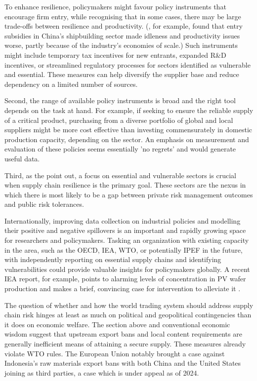 \documentclass{article}
\begin{document}
To enhance resilience, policymakers might favour policy instruments that encourage firm entry, while recognising that in some cases, there may be large trade-offs between resilience and productivity. (\textcite{barwick_chinas_2019}, for example, found that entry subsidies in China's shipbuilding sector made idleness and productivity issues worse, partly because of the industry's economies of scale.) Such instruments might include temporary tax incentives for new entrants, expanded R\&D incentives, or streamlined regulatory processes for sectors identified as vulnerable and essential. These measures can help diversify the supplier base and reduce dependency on a limited number of sources.

Second, the range of available policy instruments is broad and the right tool depends on the task at hand. For example, if seeking to ensure the reliable supply of a critical product, purchasing from a diverse portfolio of global and local suppliers might be more cost effective than investing commensurately in domestic production capacity, depending on the sector. An emphasis on measurement and evaluation of these policies seems essentially 'no regrets' and would generate useful data.

Third, as the \textcite{productivity_commission_vulnerable_2021} point out, a focus on essential and vulnerable sectors is crucial when supply chain resilience is the primary goal. These sectors are the nexus in which there is most likely to be a gap between private risk management outcomes and public risk tolerances.

Internationally, improving data collection on industrial policies and modelling their positive and negative spillovers is an important and rapidly growing space for researchers and policymakers. Tasking an organization with existing capacity in the area, such as the OECD, IEA, WTO, or potentially IPEF in the future, with independently reporting on essential supply chains and identifying vulnerabilities could provide valuable insights for policymakers globally. A recent IEA report, for example, points to alarming levels of concentration in PV wafer production and makes a brief, convincing case for intervention to alleviate it \parencite{iea_solar_2022}.

The question of whether and how the world trading system should address supply chain risk hinges at least as much on political and geopolitical contingencies than it does on economic welfare. The section above and conventional economic wisdom suggest that upstream export bans and local content requirements are generally inefficient means of attaining a secure supply. These measures already violate WTO rules. The European Union notably brought a case against Indonesia's raw materials export bans with both China and the United States joining as third parties, a case which is under appeal as of 2024.
\end{document}
